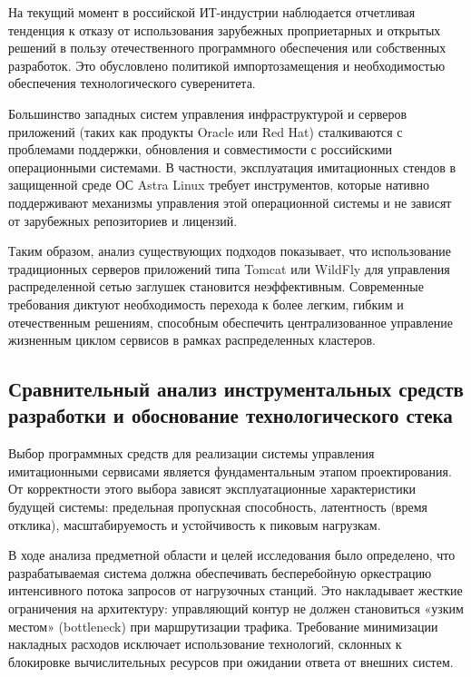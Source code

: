 \documentclass[
]{article}
\begin{document}
На текущий момент в российской ИТ-индустрии наблюдается отчетливая
тенденция к отказу от использования зарубежных проприетарных и открытых
решений в пользу отечественного программного обеспечения или собственных
разработок. Это обусловлено политикой импортозамещения и необходимостью
обеспечения технологического суверенитета.

Большинство западных систем управления инфраструктурой и серверов
приложений (таких как продукты Oracle или Red Hat) сталкиваются с
проблемами поддержки, обновления и совместимости с российскими
операционными системами. В частности, эксплуатация имитационных стендов
в защищенной среде ОС Astra Linux требует инструментов, которые нативно
поддерживают механизмы управления этой операционной системы и не зависят
от зарубежных репозиториев и лицензий.

Таким образом, анализ существующих подходов показывает, что
использование традиционных серверов приложений типа Tomcat или WildFly
для управления распределенной сетью заглушек становится неэффективным.
Современные требования диктуют необходимость перехода к более легким,
гибким и отечественным решениям, способным обеспечить централизованное
управление жизненным циклом сервисов в рамках распределенных кластеров.

\subsection{Сравнительный анализ инструментальных средств разработки и
обоснование технологического
стека}\label{ux441ux440ux430ux432ux43dux438ux442ux435ux43bux44cux43dux44bux439-ux430ux43dux430ux43bux438ux437-ux438ux43dux441ux442ux440ux443ux43cux435ux43dux442ux430ux43bux44cux43dux44bux445-ux441ux440ux435ux434ux441ux442ux432-ux440ux430ux437ux440ux430ux431ux43eux442ux43aux438-ux438-ux43eux431ux43eux441ux43dux43eux432ux430ux43dux438ux435-ux442ux435ux445ux43dux43eux43bux43eux433ux438ux447ux435ux441ux43aux43eux433ux43e-ux441ux442ux435ux43aux430}

Выбор программных средств для реализации системы управления
имитационными сервисами является фундаментальным этапом проектирования.
От корректности этого выбора зависят эксплуатационные характеристики
будущей системы: предельная пропускная способность, латентность (время
отклика), масштабируемость и устойчивость к пиковым нагрузкам.

В ходе анализа предметной области и целей исследования было определено,
что разрабатываемая система должна обеспечивать бесперебойную
оркестрацию интенсивного потока запросов от нагрузочных станций. Это
накладывает жесткие ограничения на архитектуру: управляющий контур не
должен становиться «узким местом» (bottleneck) при маршрутизации
трафика. Требование минимизации накладных расходов исключает
использование технологий, склонных к блокировке вычислительных ресурсов
при ожидании ответа от внешних систем.
\end{document}
